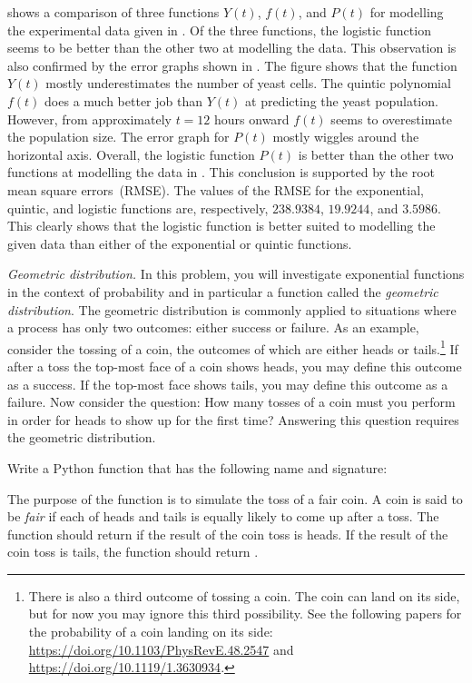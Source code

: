 \documentclass[a4paper,oneside,12pt]{article}
\begin{document}
\begin{problem}
{\begin{solution}
 shows a comparison of three
functions $Y(t)$, $f(t)$, and $P(t)$ for modelling the experimental
data given in .  Of the three functions, the logistic
function seems to be better than the other two at modelling the data.
This observation is also confirmed by the error graphs shown in
.  The figure shows that the function
$Y(t)$ mostly underestimates the number of yeast cells.  The quintic
polynomial $f(t)$ does a much better job than $Y(t)$ at predicting the
yeast population.  However, from approximately $t = 12$ hours onward
$f(t)$ seems to overestimate the population size.  The error graph for
$P(t)$ mostly wiggles around the horizontal axis.  Overall, the
logistic function $P(t)$ is better than the other two functions at
modelling the data in .  This conclusion is supported
by the root mean square errors~(RMSE).  The values of the RMSE for the
exponential, quintic, and logistic functions are, respectively,
$238.9384$, $19.9244$, and $3.5986$.  This clearly shows that the
logistic function is better suited to modelling the given data than
either of the exponential or quintic functions.
\end{solution}
}{}

\item\emph{Geometric distribution.}
  In this problem, you will investigate exponential functions in the
  context of probability and in particular a function called the
  \emph{geometric distribution}.  The geometric distribution is
  commonly applied to situations where a process has only two
  outcomes: either success or failure.  As an example, consider the
  tossing of a coin, the outcomes of which are either heads or
  tails.\footnote{
    There is also a third outcome of tossing a coin.  The coin can
    land on its side, but for now you may ignore this third
    possibility.  See the following papers for the probability of a
    coin landing on its side:
    \url{https://doi.org/10.1103/PhysRevE.48.2547} and
    \url{https://doi.org/10.1119/1.3630934}.
  }
  If after a toss the top-most face of a coin shows heads, you may
  define this outcome as a success.  If the top-most face shows tails,
  you may define this outcome as a failure.  Now consider the
  question: How many tosses of a coin must you perform in order for
  heads to show up for the first time?  Answering this question
  requires the geometric distribution.
  \begin{packedenum}
  \item\label{subprob:coin_simulation_fair_coin}
    Write a Python function that has the following name and signature:
    \begin{center}
    \end{center}
    The purpose of the function  is to simulate the
    toss of a fair coin.  A coin is said to be \emph{fair} if each of
    heads and tails is equally likely to come up after a toss.  The
    function should return  if the result of the coin toss
    is heads.  If the result of the coin toss is tails, the function
    should return .


\end{packedenum}
\end{problem}
\end{document}
